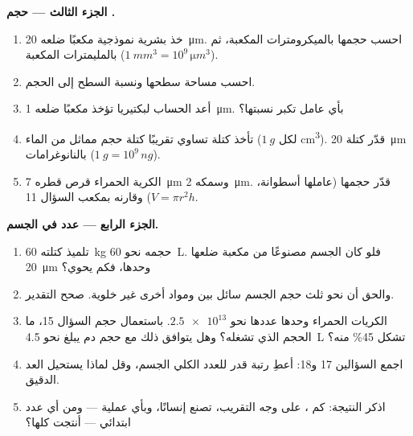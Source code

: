 \begin{problem}
\medskip
\noindent\textbf{الجزء الثالث --- حجم .}
\begin{enumerate}[resume]
  \item خذ  بشرية نموذجية مكعبًا ضلعه \qty{20}{\micro m}. احسب
        حجمها بالميكرومترات المكعبة، ثم بالمليمترات المكعبة
        ($\qty{1}{mm^3} = 10^9\,\unit{\micro m^3}$).
  \item احسب مساحة سطحها ونسبة السطح إلى الحجم.
  \item أعد الحساب لبكتيريا تؤخذ مكعبًا ضلعه \qty{1}{\micro m}. بأي
        عامل تكبر نسبتها؟
  \item تأخذ  كتلة تساوي تقريبًا كتلة حجم مماثل من الماء
        ($\qty{1}{g}$ لكل \unit{cm^3}). قدّر كتلة 
        \qty{20}{\micro m} بالنانوغرامات
        ($\qty{1}{g} = 10^9\,\unit{ng}$).
  \item الكرية الحمراء قرص قطره \qty{7}{\micro m} وسمكه
        \qty{2}{\micro m}. قدّر حجمها (عاملها أسطوانة،
        $V = \pi r^2 h$) وقارنه بمكعب السؤال 11.
\end{enumerate}

\medskip
\noindent\textbf{الجزء الرابع --- عدد  في الجسم.}
\begin{enumerate}[resume]
  \item تلميذ كتلته \qty{60}{kg} حجمه نحو \qty{60}{L}. فلو كان الجسم
        مصنوعًا من  مكعبة ضلعها \qty{20}{\micro m} وحدها، فكم
         يحوي؟
  \item والحق أن نحو ثلث حجم الجسم سائل بين  ومواد أخرى غير
        خلوية. صحح التقدير.
  \item الكريات الحمراء وحدها عددها نحو $\num{2.5e13}$. باستعمال حجم
        السؤال 15، ما الحجم الذي تشغله؟ وهل يتوافق ذلك مع حجم دم يبلغ
        نحو \qty{4.5}{L} تشكل  45\% منه؟
  \item اجمع السؤالين 17 و18: أعطِ رتبة قدر للعدد الكلي  الجسم،
        وقل لماذا يستحيل العد الدقيق.
  \item اذكر النتيجة: كم ، على وجه التقريب، تصنع إنسانًا، وبأي
        عملية --- ومن أي عدد ابتدائي --- أنتجت كلها؟
\end{enumerate}
\end{problem}
